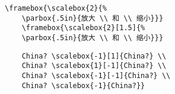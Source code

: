 \hspace{-1.5cm}\begin{minipage}[b]{.5\textwidth}
	\par\vspace{0pt}
\end{minipage}%
\begin{minipage}[b]{.5\textwidth}
	\begin{Verbatim}[formatcom=\color{VerbatimColor}\CJKfamily{kai}]
	\framebox{\scalebox{2}{%
	\parbox{.5in}{放大 \\ 和 \\ 缩小}}}
	\framebox{\scalebox{2}[1.5]{%
	\parbox{.5in}{放大 \\ 和 \\ 缩小}}}
	\end{Verbatim}
	\par\vspace{0pt}
\end{minipage}

\hspace{-1.5cm}\begin{minipage}[b]{.5\textwidth}
	\begin{center}
	\end{center}
	\par\vspace{0pt}
\end{minipage}%
\begin{minipage}[b]{.5\textwidth}
	\begin{Verbatim}
	China? \scalebox{-1}[1]{China?} \\
	China? \scalebox{1}[-1]{China?} \\
	China? \scalebox{-1}[-1]{China?} \\
	China? \scalebox{-1}{China?}}
	\end{Verbatim}
	\par\vspace{0pt}
\end{minipage}


